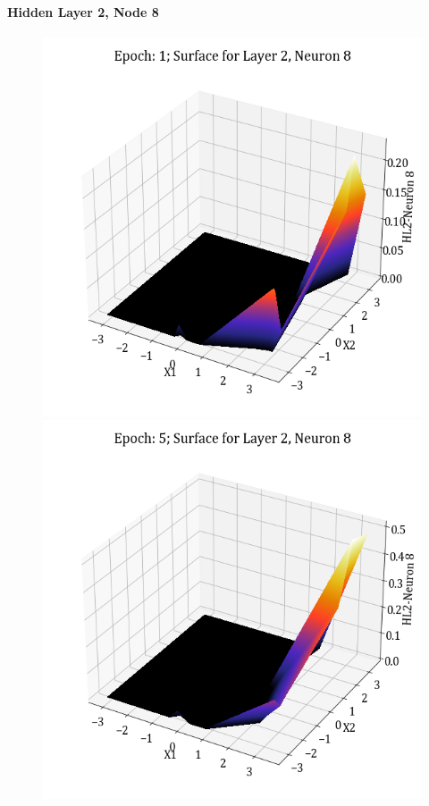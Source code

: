 \documentclass[11pt,a4paper]{article}
\begin{document}
\paragraph{Hidden Layer 2, Node 8}
\begin{figure}[H]
    \centering
    \includegraphics[scale=0.4]{images/1B_MLFFNN_E1_HL2_N8.png}
    \includegraphics[scale=0.4]{images/1B_MLFFNN_E5_HL2_N8.png}

\end{figure}
\end{document}
